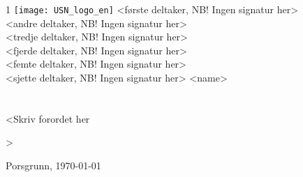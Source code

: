 \documentclass[%
norsk,     %
]{USN-BSc}
\begin{document}
\USNtitlepage%
{1}
{\vfill
  {}
   \texttt{[image: USN\_logo\_en]}}
{}  %
{%
<første deltaker, NB! Ingen signatur her>\\
<andre deltaker, NB! Ingen signatur her>\\
<tredje deltaker, NB! Ingen signatur her>\\
<fjerde deltaker, NB! Ingen signatur her>\\
<femte deltaker, NB! Ingen signatur her>\\
<sjette deltaker, NB! Ingen signatur her>
}
{<name>}
{%
\lipsum[7]
}
{%
\lipsum[7]
}

\chapter*{\USNpreface}
\label{sec:preface}
<Skriv forordet her

\lipsum[1]>

Porsgrunn, \today


\tableofcontents
{}

\listoffigures %

\listoftables  %
\end{document}
